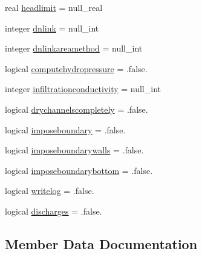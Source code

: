 \begin{DoxyCompactItemize}
real \mbox{\hyperlink{structmoduleporousmedia_1_1t__soiloptions_a4dd3b7d0556922270d31d296cacfa7da}{headlimit}} = null\+\_\+real
\item 
integer \mbox{\hyperlink{structmoduleporousmedia_1_1t__soiloptions_a3279ed0658b306f07a788f84eca85e2b}{dnlink}} = null\+\_\+int
\item 
integer \mbox{\hyperlink{structmoduleporousmedia_1_1t__soiloptions_a5928464a3d089046682d56794f06ec90}{dnlinkareamethod}} = null\+\_\+int
\item 
logical \mbox{\hyperlink{structmoduleporousmedia_1_1t__soiloptions_ae7109626c96d6c07b3027c1d3d6fe5f4}{computehydropressure}} = .false.
\item 
integer \mbox{\hyperlink{structmoduleporousmedia_1_1t__soiloptions_ac36d1bda6e2aa8e00684bd96a8a95c80}{infiltrationconductivity}} = null\+\_\+int
\item 
logical \mbox{\hyperlink{structmoduleporousmedia_1_1t__soiloptions_a602362fdb5692177fa9c909d199e8693}{drychannelscompletely}} = .false.
\item 
logical \mbox{\hyperlink{structmoduleporousmedia_1_1t__soiloptions_aa2c940d247d992f0376553cc0014c61b}{imposeboundary}} = .false.
\item 
logical \mbox{\hyperlink{structmoduleporousmedia_1_1t__soiloptions_ac54247ffcfc1e9d1fe3ba233de4b9175}{imposeboundarywalls}} = .false.
\item 
logical \mbox{\hyperlink{structmoduleporousmedia_1_1t__soiloptions_a6ba93ce06fe55d52b6384f127f41f055}{imposeboundarybottom}} = .false.
\item 
logical \mbox{\hyperlink{structmoduleporousmedia_1_1t__soiloptions_abd790cfe78c149dc42b9d1a236cb260f}{writelog}} = .false.
\item 
logical \mbox{\hyperlink{structmoduleporousmedia_1_1t__soiloptions_aeb1f27b73ea3641e6fad964c1e8ca757}{discharges}} = .false.
\end{DoxyCompactItemize}


\subsection{Member Data Documentation}
\mbox{\label{structmoduleporousmedia_1_1t__soiloptions_ab3c2ac806db1d13354ba04cb2abe049f}} 
